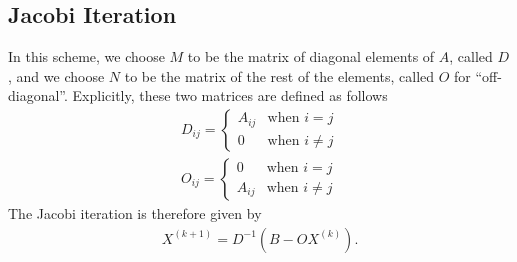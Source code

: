 \subsection{Jacobi Iteration}
In this scheme, we choose $M$ to be the matrix of diagonal elements of $A$, called $D$, and we choose $N$ to be the matrix of the rest of the elements, called $O$ for ``off-diagonal''. Explicitly, these two matrices are defined as follows
\begin{align*}
D_{ij} =
\begin{cases}
A_{ij} & \text{when } i=j \\
0 & \text{when } i\neq j 
\end{cases} \\
O_{ij} =
\begin{cases}
0 & \text{when } i=j \\
A_{ij} & \text{when } i\neq j 
\end{cases}
\end{align*}
The Jacobi iteration is therefore given by
\begin{align*}
X^{(k+1)} = D^{-1}\left(B - OX^{(k)}\right).
\end{align*}

